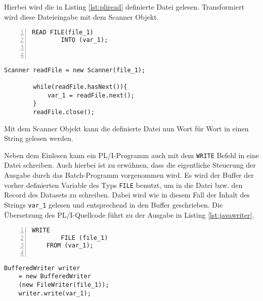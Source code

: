 Hierbei wird die in Listing \ref{lst:pliread} definierte Datei gelesen.
Transformiert wird diese Dateieingabe mit dem Scanner Objekt.

\begin{minipage}[b]{0.48\linewidth}
	\centering
	\lstset{language=PL/I,label=SliceExaple}
	\begin{lstlisting}[frame=single, numbers=left, mathescape,%
		caption={Dateieingabe}, label={lst:pliread}]
		READ FILE(file_1) 
		INTO (var_1); 
		
		
	\end{lstlisting}
\end{minipage}
\hspace{0.5cm}
\begin{minipage}[b]{0.48\linewidth}
	\centering
	\lstset{language=Java,label=SliceExaple}
	\begin{lstlisting}[frame=single, mathescape,%
		title={" "}]
		Scanner readFile = new Scanner(file_1);
		
		while(readFile.hasNext()){
			var_1 = readFile.next();
		}
		readFile.close();
	\end{lstlisting}
\end{minipage}  


Mit dem Scanner Objekt kann die definierte Datei nun Wort für Wort in einen String gelesen werden.

Neben dem Einlesen kann ein PL/I-Programm auch mit dem \verb+WRITE+ Befehl in eine Datei schreiben.
Auch hierbei ist zu erwähnen, dass die eigentliche Steuerung der Ausgabe durch das Batch-Programm vorgenommen wird.
Es wird der Buffer der vorher definierten Variable des Typs \verb+FILE+ benutzt, um in die Datei bzw. den Record
des Datasets zu schreiben. Dabei wird wie in diesem Fall der Inhalt des Strings \verb+var_1+ gelesen und entsprechend
in den Buffer geschrieben.
Die Übersetzung des PL/I-Quellcode führt zu der Ausgabe in Listing \ref{lst:javawriter}.

\begin{minipage}[b]{0.48\linewidth}
	\centering
	\lstset{language=PL/I,label=SliceExaple}
	\begin{lstlisting}[frame=single, numbers=left, mathescape,%
		caption={Dateiausgabe}, label={lst:javawriter}]
	WRITE 
		FILE (file_1) 
	FROM (var_1);	
	
	\end{lstlisting}
\end{minipage}
\hspace{0.5cm}
\begin{minipage}[b]{0.48\linewidth}
	\centering
	\lstset{language=Java,label=SliceExaple}
	\begin{lstlisting}[frame=single, mathescape,%
		title={" "}]
	BufferedWriter writer 
	= new BufferedWriter
	(new FileWriter(file_1)); 
	writer.write(var_1);
	\end{lstlisting}
\end{minipage}  

